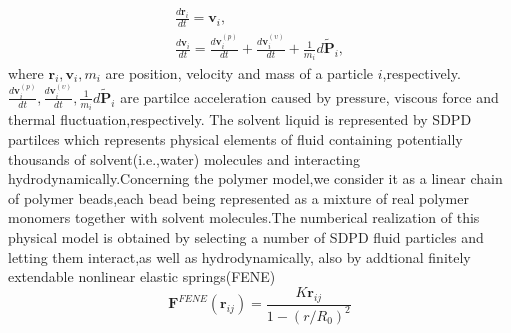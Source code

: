 \documentclass[aps,pre,twocolumn,showpacs,superscriptaddress,groupedaddress]{revtex4}  %
\begin{document}
\begin{eqnarray}\label{equ:momesum}
 \frac{d\mathbf{r}_i}{dt}=\mathbf{v}_i,\\
\frac{d\mathbf{v}_i}{dt}=\frac{d\mathbf{v}_{i}^{(p)}}{dt}+\frac{d\mathbf{v}_{i}^{(\upsilon)}}{dt}+\frac{1}{m_i}d\tilde{\mathbf{P}}_i,
\end{eqnarray}
where $\mathbf{r}_i,\mathbf{v}_i,m_i$ are position, velocity and mass of a particle $i$,respectively.
$\frac{d\mathbf{v}_{i}^{(p)}}{dt},\frac{d\mathbf{v}_{i}^{(\upsilon)}}{dt},\frac{1}{m_i}d\tilde{\mathbf{P}}_i $ are partilce acceleration caused by pressure,
viscous force and thermal fluctuation,respectively.
The solvent liquid is represented by SDPD partilces which represents physical elements of fluid containing potentially thousands of solvent(i.e.,water)
 molecules and interacting hydrodynamically.Concerning the polymer model,we consider it as a linear chain of polymer beads,each bead 
being represented as a mixture of real polymer monomers together with solvent molecules.The numberical realization of this physical model is obtained by selecting a number of
SDPD fluid particles and letting them interact,as well as hydrodynamically, also by addtional finitely extendable nonlinear elastic springs(FENE) 
\begin{equation}\label{equ:fene}
 \mathbf{F}^{FENE}(\mathbf{r}_{ij})=\frac{K\mathbf{r}_{ij}}{1-(r/R_0)^2}
\end{equation}
\end{document}
